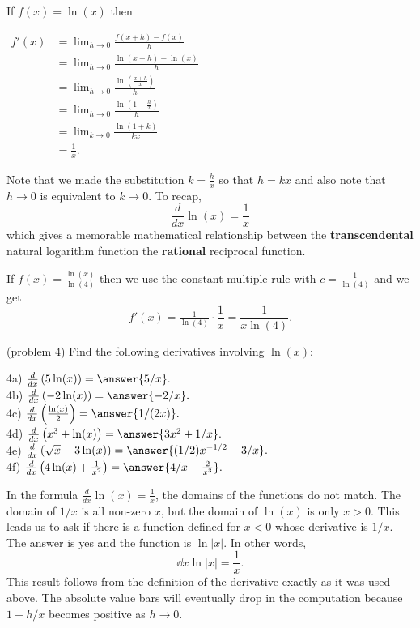 \documentclass{ximera}
\begin{document}
If $f(x) = \ln(x)$ then\\[10pt]
\begin{center}
$\begin{aligned}
f'(x) &= \lim_{h \to 0} \frac{f(x+h)-f(x)}{h}\\[5pt]
&= \lim_{h \to 0}\frac{\ln(x+h)-\ln(x)}{h}\\[5pt]
&= \lim_{h \to 0} \frac{\ln(\frac{x+h}{x})}{h}\\[5pt]
&= \lim_{h \to 0}\frac{\ln(1 + \frac{h}{x})}{h}\\[5pt]
&= \lim_{k \to 0} \frac{\ln(1 + k)}{kx} \\[5pt]
&= \frac{1}{x}.
\end{aligned}$
\end{center}

Note that we made the substitution $k =\frac{h}{x}$ so that $h = kx$ and  also note 
that $h\to 0$ is equivalent to $k\to 0$.
To recap, 
\[
\frac{d}{dx} \ln(x) = \frac{1}{x}
\]
which gives a memorable mathematical relationship between the \textbf{transcendental} natural logarithm function 
the \textbf{rational} reciprocal function.


\begin{example}[example 4]
 If $f(x) = \frac{\ln(x)}{\ln(4)}$ then we use the constant multiple rule with $c = \frac{1}{\ln(4)}$ 
and we get 
\[
f'(x) = \tfrac{1}{\ln(4)} \cdot \frac{1}{x} = \frac{1}{x\ln(4)}.
\]
\end{example}



\begin{problem}(problem 4)
Find the following derivatives involving $\ln(x)$:

4a) $\frac{d}{dx} \left(5\ln(x)\right) = \answer{5/x}.$\\
4b) $\frac{d}{dx} \left(-2\ln(x)\right) = \answer{-2/x}.$\\
4c) $\frac{d}{dx} \left(\frac{\ln(x)}{2}\right) = \answer{1/(2x)}.$\\
4d) $\frac{d}{dx} \left(x^3 + \ln(x)\right) = \answer{3x^2 + 1/x}.$\\
4e) $\frac{d}{dx} \left(\sqrt x - 3\ln(x)\right) = \answer{(1/2)x^{-1/2} - 3/x}.$\\
4f) $\frac{d}{dx} \left(4\ln(x) + \frac{1}{x^2}\right) = \answer{4/x -\frac{2}{x^3}}.$


\end{problem}





In the formula $\tfrac{d}{dx} \ln(x) = \tfrac{1}{x}$, the domains of the functions do not match.  The domain of $1/x$ is all non-zero $x$, but the domain of 
$\ln(x)$  is only $x >0$.  This leads us to ask if there is a function defined for $x<0$ whose derivative is $1/x$. The answer is yes and the function is 
$\ln|x|$. In other words,
\[
\dd{x} \ln|x| = \frac{1}{x}.
\]
This result follows from the definition of the derivative exactly as it was used above.  
The absolute value bars will eventually drop in the computation because $1+h/x$ becomes positive as $h \to 0$.
 
\end{document}
